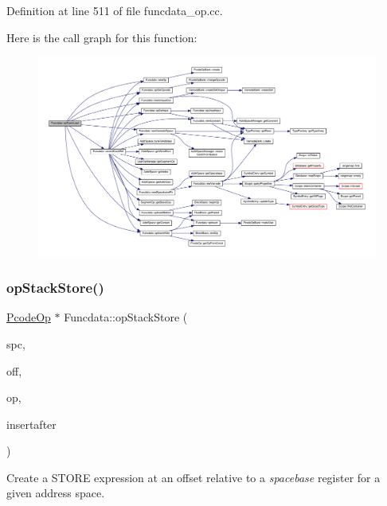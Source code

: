 Definition at line 511 of file funcdata\+\_\+op.\+cc.

Here is the call graph for this function\+:
\nopagebreak
\begin{figure}[H]
\begin{center}
\leavevmode
\includegraphics[width=350pt]{class_funcdata_a37b36505bab6f7c5676157288e65d5c6_cgraph}
\end{center}
\end{figure}
\mbox{\label{class_funcdata_a4582ad34b4e7c851d92db8544999eaf3}} 
\subsubsection{\texorpdfstring{opStackStore()}{opStackStore()}}
{\footnotesize\ttfamily \mbox{\hyperlink{class_pcode_op}{Pcode\+Op}} $\ast$ Funcdata\+::op\+Stack\+Store (\begin{DoxyParamCaption}\item[{\mbox{\hyperlink{class_addr_space}{Addr\+Space}} $\ast$}]{spc,  }\item[{\mbox{\hyperlink{types_8h_a2db313c5d32a12b01d26ac9b3bca178f}{uintb}}}]{off,  }\item[{\mbox{\hyperlink{class_pcode_op}{Pcode\+Op}} $\ast$}]{op,  }\item[{bool}]{insertafter }\end{DoxyParamCaption})}



Create a S\+T\+O\+RE expression at an offset relative to a {\itshape spacebase} register for a given address space. 

